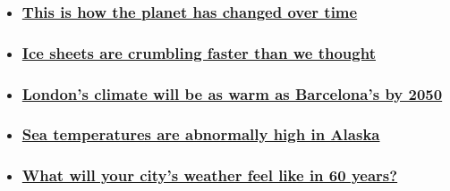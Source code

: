 \begin{itemize}
\item
  \hypertarget{this-is-how-the-planet-has-changed-over-time-}{%
  \subsubsection{\texorpdfstring{\href{https://www.cnn.com/interactive/2019/09/world/climate-change-before-after/}{This
  is how the planet has changed over time
  }}{This is how the planet has changed over time }}\label{this-is-how-the-planet-has-changed-over-time-}}
\item
  \hypertarget{ice-sheets-are-crumbling-faster-than-we-thought}{%
  \subsubsection{\texorpdfstring{\href{/2019/07/10/world/antarctica-ice-sheet-sea-levels-trnd/index.html}{Ice
  sheets are crumbling faster than we
  thought}}{Ice sheets are crumbling faster than we thought}}\label{ice-sheets-are-crumbling-faster-than-we-thought}}
\item
  \hypertarget{londons-climate-will-be-as-warm-as-barcelonas-by-2050}{%
  \subsubsection{\texorpdfstring{\href{/2019/07/11/europe/climate-cities-report-intl-hnk/index.html}{London's
  climate will be as warm as Barcelona's by
  2050}}{London's climate will be as warm as Barcelona's by 2050}}\label{londons-climate-will-be-as-warm-as-barcelonas-by-2050}}
\item
  \hypertarget{sea-temperatures-are-abnormally-high-in-alaska}{%
  \subsubsection{\texorpdfstring{\href{/2019/06/28/us/alaska-sea-ice-wxc/index.html}{Sea
  temperatures are abnormally high in
  Alaska}}{Sea temperatures are abnormally high in Alaska}}\label{sea-temperatures-are-abnormally-high-in-alaska}}
\item
  \hypertarget{what-will-your-citys-weather-feel-like-in-60-years-}{%
  \subsubsection{\texorpdfstring{\href{/2019/02/12/health/climate-change-cities-projected-temperatures-study/index.html}{What
  will your city's weather feel like in 60 years?
  }}{What will your city's weather feel like in 60 years? }}\label{what-will-your-citys-weather-feel-like-in-60-years-}}
\end{itemize}

